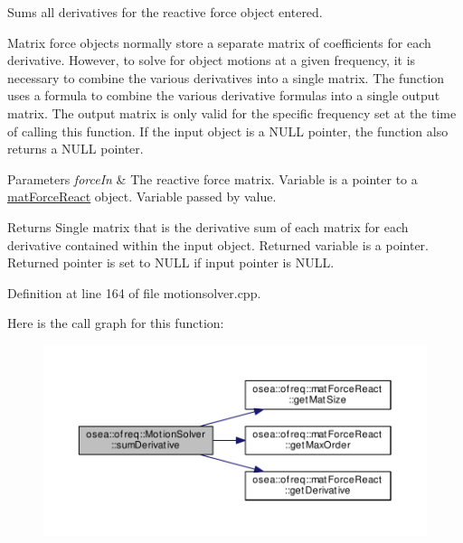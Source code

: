 Sums all derivatives for the reactive force object entered. 

Matrix force objects normally store a separate matrix of coefficients for each derivative. However, to solve for object motions at a given frequency, it is necessary to combine the various derivatives into a single matrix. The function uses a formula to combine the various derivative formulas into a single output matrix. The output matrix is only valid for the specific frequency set at the time of calling this function. If the input object is a N\-U\-L\-L pointer, the function also returns a N\-U\-L\-L pointer. 
\begin{DoxyParams}{Parameters}
{\em force\-In} & The reactive force matrix. Variable is a pointer to a \hyperlink{classosea_1_1ofreq_1_1mat_force_react}{mat\-Force\-React} object. Variable passed by value. \\
\hline
\end{DoxyParams}
\begin{DoxyReturn}{Returns}
Single matrix that is the derivative sum of each matrix for each derivative contained within the input object. Returned variable is a pointer. Returned pointer is set to N\-U\-L\-L if input pointer is N\-U\-L\-L. 
\end{DoxyReturn}


Definition at line 164 of file motionsolver.\-cpp.



Here is the call graph for this function\-:\nopagebreak
\begin{figure}[H]
\begin{center}
\leavevmode
\includegraphics[width=350pt]{classosea_1_1ofreq_1_1_motion_solver_abe3c2cac5c822e59db5914bf5450d514_cgraph}
\end{center}
\end{figure}


